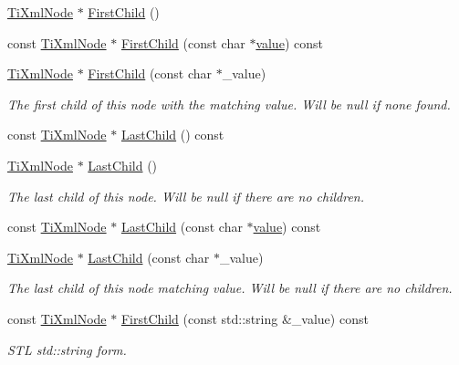 \begin{DoxyCompactItemize}
\hyperlink{class_ti_xml_node}{Ti\+Xml\+Node} $\ast$ \hyperlink{class_ti_xml_node_a5e97d69b7c0ebd27fb7286be56559b77}{First\+Child} ()
\item 
const \hyperlink{class_ti_xml_node}{Ti\+Xml\+Node} $\ast$ \hyperlink{class_ti_xml_node_ae98c367f664890c4b5a5183481ec128a}{First\+Child} (const char $\ast$\hyperlink{class_ti_xml_node_aead528b3cedc33c16a6c539872c7cc8b}{value}) const
\item 
\hyperlink{class_ti_xml_node}{Ti\+Xml\+Node} $\ast$ \hyperlink{class_ti_xml_node_abc8bf32be6419ec453a731868de19554}{First\+Child} (const char $\ast$\+\_\+value)
\begin{DoxyCompactList}\small\item\em The first child of this node with the matching \textquotesingle{}value\textquotesingle{}. Will be null if none found. \end{DoxyCompactList}\item 
const \hyperlink{class_ti_xml_node}{Ti\+Xml\+Node} $\ast$ \hyperlink{class_ti_xml_node_af3a04120b1ed2fead2f4bb72cbea845e}{Last\+Child} () const
\item 
\hyperlink{class_ti_xml_node}{Ti\+Xml\+Node} $\ast$ \hyperlink{class_ti_xml_node_a6432d2b2495f6caf9cb4278df706a031}{Last\+Child} ()
\begin{DoxyCompactList}\small\item\em The last child of this node. Will be null if there are no children. \end{DoxyCompactList}\item 
const \hyperlink{class_ti_xml_node}{Ti\+Xml\+Node} $\ast$ \hyperlink{class_ti_xml_node_afdd7b6ba456fdd570610c1d841f91eb3}{Last\+Child} (const char $\ast$\hyperlink{class_ti_xml_node_aead528b3cedc33c16a6c539872c7cc8b}{value}) const
\item 
\hyperlink{class_ti_xml_node}{Ti\+Xml\+Node} $\ast$ \hyperlink{class_ti_xml_node_abad5bf1059c48127b958711ef89e8e5d}{Last\+Child} (const char $\ast$\+\_\+value)
\begin{DoxyCompactList}\small\item\em The last child of this node matching \textquotesingle{}value\textquotesingle{}. Will be null if there are no children. \end{DoxyCompactList}\item 
const \hyperlink{class_ti_xml_node}{Ti\+Xml\+Node} $\ast$ \hyperlink{class_ti_xml_node_ab7f52e96c41fca07e81521b5f5ea35b9}{First\+Child} (const std\+::string \&\+\_\+value) const
\begin{DoxyCompactList}\small\item\em S\+TL std\+::string form. \end{DoxyCompactList}\item 

\end{DoxyCompactItemize}
